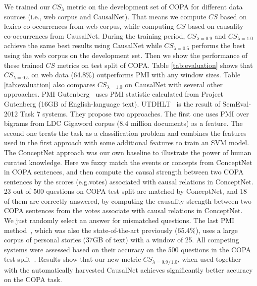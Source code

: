 \documentclass[letterpaper]{article}
\newcommand{\tabref}[1]{Table \ref{#1}}
\begin{document}
We trained our $CS_{\lambda}$ metric
on the development set of COPA
for different data sources (i.e., web corpus and CausalNet).
That means we compute $CS$ based on lexico co-occurrences from web corpus,
while computing $CS$ based on causality co-occurrences from CausalNet.
During the training period,
$CS_{\lambda=0.9}$ and $CS_{\lambda=1.0}$ achieve the same best results
using CausalNet while $CS_{\lambda=0.5}$
performs the best using the web corpus on the development set.
Then we show the performance of these trained $CS$ metrics on test split of COPA.
\tabref{tab:evaluation} shows that
$CS_{\lambda = 0.5}$ on web data
(64.8\%) outperforms PMI with any window sizes.
\tabref{tab:evaluation} also compares $CS_{\lambda=1.0}$ on CausalNet
with several other approaches.
PMI Gutenberg~\cite{roemmele2011choice} uses PMI statistic calculated
from Project Gutenberg (16GB of English-language text).
UTDHLT~\cite{goodwin2012utdhlt} is the
result of SemEval-2012 Task 7 systems. They propose two
approaches. The first one uses PMI over bigrams from LDC Gigaword corpus
(8.4 million documents) as a
feature. The second one treats the task as a classification
problem and combines the features used in the first approach with
some additional features to train an SVM model.
The ConceptNet approach was our own baseline to illustrate the power of
human curated knowledge. Here we fuzzy match
the events or concepts from ConceptNet in COPA sentences, and then compute
the causal strength between two COPA sentences by the scores (e.g.votes)
associated with
causal relations in ConceptNet.
23 out of 500 questions
on COPA test split are matched by ConceptNet,
and 18 of them are correctly answered,
by computing the causality strength between two COPA sentences
from the votes associate with causal relations in ConceptNet.
We just randomly select an answer
for mismatched questions.
The last PMI method~\cite{gordon2011commonsense}, which was also the
state-of-the-art previously (65.4\%), uses a large corpus of
personal stories (37GB of text) with a window of 25.
All competing systems were assessed based
on their accuracy on the 500 questions in the COPA test
split~\cite{gordon2012copa}. Results show that our new metric
$CS_{\lambda=0.9}$$_{/}$$_{1.0}$,
when used together with the automatically harvested CausalNet
achieves significantly better accuracy on the COPA task.
\end{document}
